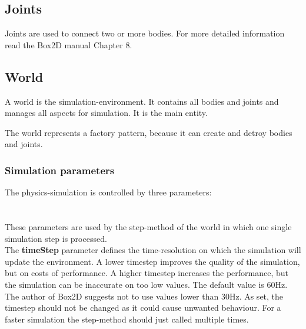 \documentclass[10pt,a4paper,DIV=11]{scrreprt}
\begin{document}
\subsection{Joints}
Joints are used to connect two or more bodies. For more detailed information read the Box2D manual Chapter 8.

\subsection{World}
A world is the simulation-environment. It contains all bodies and joints and manages all aspects for simulation. It is the main entity.

The world represents a factory pattern, because it can create and detroy bodies and joints.

\subsubsection*{Simulation parameters}
The physics-simulation is controlled by three parameters: \\

   \\
\\

These parameters are used by the step-method of the world in which one single simulation step is processed. \\

The \textbf{timeStep} parameter defines the time-resolution on which the simulation will update the environment. A lower timestep improves the quality of the simulation, but on costs of performance. A higher timestep increases the performance, but the simulation can be inaccurate on too low values.
The default value is 60Hz. The author of Box2D suggests not to use values lower than 30Hz. As set, the timestep should not be changed as it could cause unwanted behaviour. For a faster simulation the step-method should just called multiple times. \\
\end{document}
